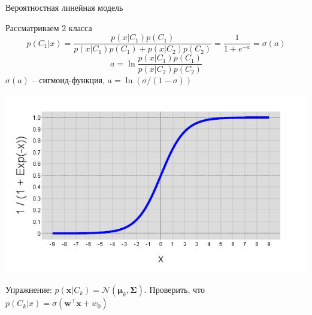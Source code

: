 \documentclass[10pt,a4paper]{beamer}
\begin{document}
\begin{frame}{Вероятностная линейная модель}

Рассматриваем 2 класса
\[
p(C_1 | x) = \frac{p(x | C_1)p(C_1)}{p(x | C_1)p(C_1) + p(x | C_2)p(C_2)} = \frac{1}{1 + e^{-a}} = \sigma(a)
\]
\[
a = \ln \frac{p(x | C_1)p(C_1)}{p(x | C_2)p(C_2)}
\]
$\sigma(a)$ -- сигмоид-функция, $a = \ln (\sigma/(1-\sigma))$

\begin{center}
\includegraphics[scale=0.3]{images/sigmoid.jpg}
\end{center}

Упражнение: $p(\mathbf{x} | C_k) = \mathcal{N}(\mathbf{\mu}_k, \mathbf{\Sigma})$. Проверить, что $p(C_k | x) = \sigma(\mathbf{w}^\top \mathbf{x} + w_0)$

\end{frame}

\end{document}
